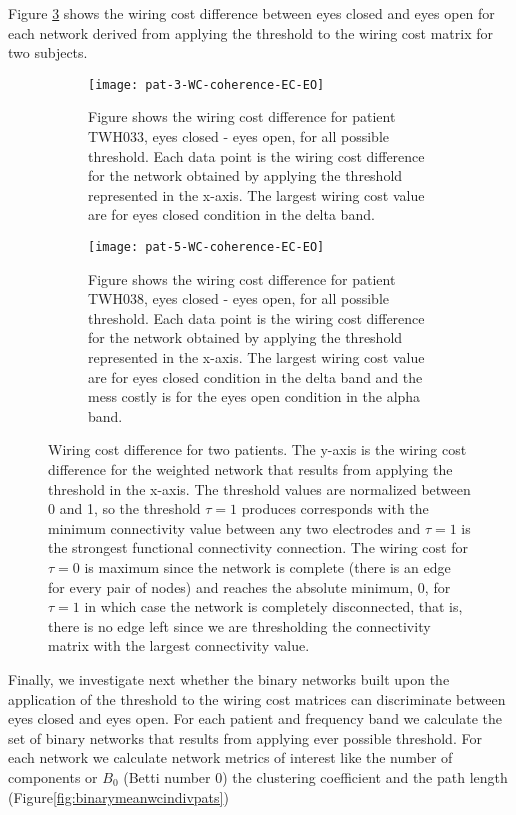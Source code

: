 \documentclass[11pt, onecolumn]{article}
\begin{document}
Figure \ref{fig:wcindivpats} shows the wiring cost difference between eyes closed and eyes open for each network derived from applying the threshold to the wiring cost matrix for two subjects.
\begin{figure}[ht] 
  \begin{subfigure}[t]{0.5\linewidth}
    \centering
    \texttt{[image: pat-3-WC-coherence-EC-EO]} 
    \caption{Figure shows the wiring cost difference for patient TWH033, eyes closed - eyes open, for all possible threshold. Each data point is the wiring cost difference for the network obtained by applying the threshold represented in the x-axis. The largest wiring cost value are for eyes closed condition in the delta band.} 
    \label{fig:wcindivpats:a} 
    \vspace{4ex}
  \end{subfigure}%
  \hspace{1ex}
  \begin{subfigure}[t]{0.5\linewidth}
    \centering
    \texttt{[image: pat-5-WC-coherence-EC-EO]} 
    \caption{Figure shows the wiring cost difference for patient TWH038, eyes closed - eyes open, for all possible threshold. Each data point is the wiring cost difference for the network obtained by applying the threshold represented in the x-axis. The largest wiring cost value are for eyes closed condition in the delta band and the mess costly is for the eyes open condition in the alpha band.} 
    \label{fig:wcindivpats:b} 
    \vspace{4ex}
  \end{subfigure} 
  \caption{Wiring cost difference for two patients. The y-axis is the wiring cost difference for the weighted network that results from applying the threshold in the x-axis. The threshold values are normalized between 0 and 1, so the threshold $\tau = 1$ produces corresponds with the minimum connectivity value between any two electrodes and  $\tau = 1$ is the strongest functional connectivity connection. The wiring cost for $\tau = 0$ is maximum since the network is complete (there is an edge for every pair of nodes) and reaches the absolute minimum, 0, for $\tau = 1$ in which case the network is completely  disconnected, that is, there is no edge left since we are thresholding the connectivity matrix with the largest connectivity value.}
  \label{fig:wcindivpats} 
\end{figure}


Finally, we investigate next whether the binary networks built upon the application of the threshold to the wiring cost matrices can discriminate between eyes closed and eyes open. For each patient and frequency band we calculate the set of binary networks that results from applying ever possible threshold. For each network we calculate network metrics of interest like the number of components or $B_0$ (Betti number 0) the clustering coefficient and the path length (Figure\ref{fig:binarymeanwcindivpats})
\end{document}
